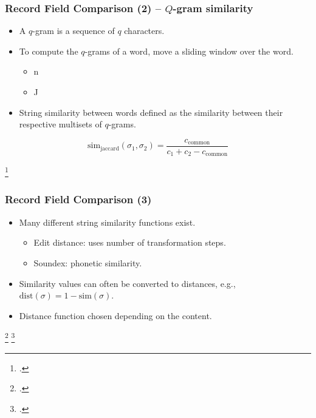 \documentclass[12pt]{beamer}
\theoremstyle{break}
\begin{document}
\begin{frame}
	\frametitle{Record Field Comparison (2) -- $Q$-gram similarity}
	
	\begin{itemize}
		\item A $q$-gram is a sequence of $q$ characters.
		\item To compute the $q$-grams of a word, move a sliding window over the word.\begin{itemize}
				\item {}n
				\item J
			\end{itemize}
		\item String similarity between words defined as the similarity between their respective multisets of $q$-grams.\footnotemark
	\end{itemize}
	
	\pause
	
	\begin{equation*}
		\textrm{sim}_{\textrm{jaccard}}(\sigma_1, \sigma_2) = \frac{c_{\textrm{common}}}{c_1 + c_2 - c_{\textrm{common}}}
	\end{equation*}
	
	\footcitetext{Ukkonen1992}

\end{frame}




\begin{frame}
	\frametitle{Record Field Comparison (3)}
	
	\begin{itemize}
		\item Many different string similarity functions exist. \begin{itemize}
			\item Edit distance\footnotemark: uses number of transformation steps.
			\item Soundex\footnotemark: phonetic similarity.
		\end{itemize}
		\item Similarity values can often be converted to distances, e.g., $\mathrm{dist}(\sigma)=1-\mathrm{sim}(\sigma)$.
		\item Distance function chosen depending on the content.
	\end{itemize}
	
	\footcitetext{Levenshtein1966}
	\footcitetext{Soundex}
	
\end{frame}
\end{document}
